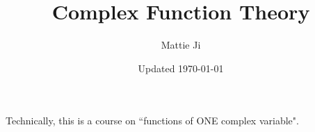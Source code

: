 \documentclass{article}
\title{Complex Function Theory}
\author{Mattie Ji}
\date{Updated \today}
\begin{document}
\maketitle

\noindent Technically, this is a course on ``functions of ONE complex variable".
\tableofcontents
\newpage












\end{document}
